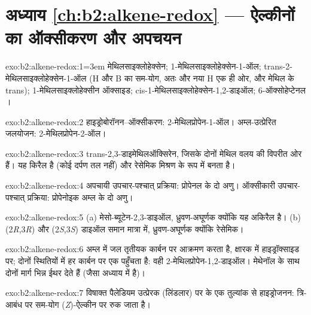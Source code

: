 \section*{अध्याय \ref{ch:b2:alkene-redox} --- ऐल्कीनों का ऑक्सीकरण और अपचयन}

\begin{solution}{exo:b2:alkene-redox:1}\emergencystretch=3em
मेथिलसाइक्लोहेक्सेन; 1-मेथिलसाइक्लोहेक्सेन-1-ऑल; trans-2-मेथिलसाइक्लोहेक्सेन-1-ऑल (H और B का
सम-योग, अतः  और नया H एक ही ओर, और मेथिल  के trans);
1-मेथिलसाइक्लोहेक्सीन ऑक्साइड; cis-1-मेथिलसाइक्लोहेक्सेन-1,2-डाइऑल; 6-ऑक्सोहेप्टेनल
।
\end{solution}

\begin{solution}{exo:b2:alkene-redox:2}
हाइड्रोबोरॉनन--ऑक्सीकरण: 2-मेथिलप्रोपेन-1-ऑल। अम्ल-उत्प्रेरित जलयोजन:
2-मेथिलप्रोपेन-2-ऑल।
\end{solution}

\begin{solution}{exo:b2:alkene-redox:3}
trans-2,3-डाइमेथिलऑक्सिरेन, जिसके दोनों मेथिल वलय की विपरीत ओर हैं। यह किरैल है (कोई
दर्पण तल नहीं) और रेसेमिक मिश्रण के रूप में बनता है।
\end{solution}

\begin{solution}{exo:b2:alkene-redox:4}
अपचायी उपचार-पश्चात् प्रक्रिया: प्रोपेनल के दो अणु। ऑक्सीकारी उपचार-पश्चात् प्रक्रिया: प्रोपेनोइक
अम्ल के दो अणु।
\end{solution}

\begin{solution}{exo:b2:alkene-redox:5}
(a) मेसो-ब्यूटेन-2,3-डाइऑल, ध्रुवण-अघूर्णक क्योंकि यह अकिरैल है। (b)
(2\textit{R},3\textit{R}) और (2\textit{S},3\textit{S}) डाइऑल समान मात्रा में, ध्रुवण-अघूर्णक
क्योंकि रेसेमिक।
\end{solution}

\begin{solution}{exo:b2:alkene-redox:6}
अम्ल में जल तृतीयक कार्बन पर आक्रमण करता है, क्षारक में हाइड्रॉक्साइड  पर; दोनों
स्थितियों में हर कार्बन पर एक  पहुँचता है: वही 2-मेथिलप्रोपेन-1,2-डाइऑल। मेथेनॉल के साथ दोनों
मार्ग भिन्न ईथर देते हैं (जैसा अध्याय में है)।
\end{solution}

\begin{solution}{exo:b2:alkene-redox:7}
विषाक्त पैलेडियम उत्प्रेरक (लिंडलार) पर  के एक तुल्यांक से हाइड्रोजनन:
त्रि-आबंध पर सम-योग (\textit{Z})-ऐल्कीन पर रुक जाता है।
\end{solution}

